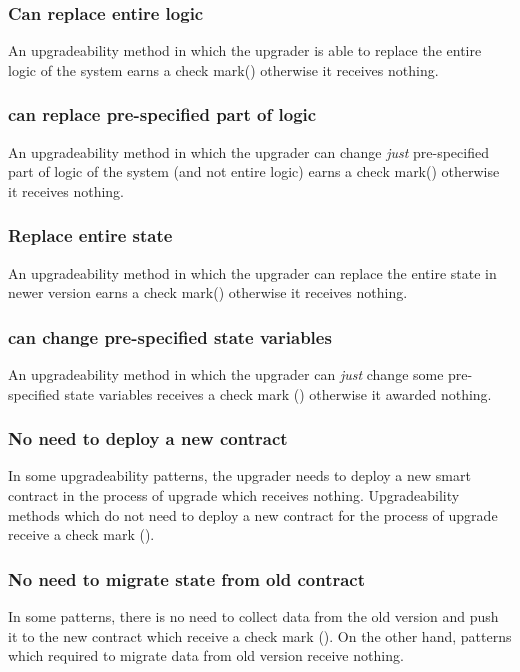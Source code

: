 \subsubsection{Can replace entire logic}
An upgradeability method in which the upgrader is able to replace the entire logic of the system earns a check mark(\checkmark) otherwise it receives nothing.

\subsubsection{can replace pre-specified part of logic}
An upgradeability method in which the upgrader can change \emph{just} pre-specified part of logic of the system (and not entire logic) earns a check mark(\checkmark) otherwise it receives nothing.

\subsubsection{Replace entire state}
An upgradeability method in which the upgrader can replace the entire state in newer version earns a check mark(\checkmark) otherwise it receives nothing.

\subsubsection{can change pre-specified state variables}
An upgradeability method in which the upgrader can \emph{just} change some pre-specified state variables receives a check mark (\checkmark) otherwise it awarded nothing.

\subsubsection{No need to deploy a new contract}
In some upgradeability patterns, the upgrader needs to deploy a new smart contract in the process of upgrade which receives nothing. Upgradeability methods which do not need to deploy a new contract for the process of upgrade receive a check mark (\checkmark).

\subsubsection{No need to migrate state from old contract}
In some patterns, there is no need to collect data from the old version and push it to the new contract which receive a check mark (\checkmark). On the other hand, patterns which required to migrate data from old version receive nothing.

